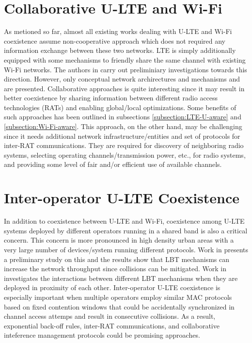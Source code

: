 \section{Collaborative U-LTE and Wi-Fi}
As metioned so far, almost all existing works dealing with U-LTE and Wi-Fi coexistence assume non-cooperative approach which does not required any information exchange between these two networks. LTE is simply additionally equipped with some mechanisms to friendly share the same channel with existing Wi-Fi networks. The authors in \cite{U-LTE-5G-2015, Coordinated-LTE-U-Wi-Fi-2015} carry out preliminiary investigations towards this direction. However, only conceptual network archirectures and mechanisms and are presented. Collaborative approaches is quite interesting since it may result in better coexistence by sharing information between different radio access technologies (RATs) and enabling global/local optimizations. Some benefits of such approaches has been outlined in subsections \ref{subsection:LTE-U-aware} and \ref{subsection:Wi-Fi-aware}. This approach, on the other hand, may be challenging since it needs additional network infrastructure/entities and set of protocols for inter-RAT communications. They are required for discovery of neighboring radio systems, selecting operating channels/transmission power, etc., for radio systems, and providing some level of fair and/or efficient use of available channels. 

\section{Inter-operator U-LTE Coexistence}
In addition to coexistence between U-LTE and Wi-Fi, coexistence among U-LTE systems deployed by different operators running in a shared band is also a critical concern. This concern is more pronounced in high density urban areas with a very large number of devices/system running different protocols. Work in \cite{LTE-U-ICC-WS-2015} presents a preliminary study on this and the results show that LBT mechanisms can increase the network throughput since collisions can be mitigated. Work in \cite{Enhanced-LTE-U-thesis-2015} investigates the interactions between different LBT mechanisms when they are deployed in proximity of each other. Inter-operator U-LTE coexistence is especially important when multiple operators employ similar MAC protocols based on fixed contention windows that could be accidentally synchronized in channel access attemps and result in consecutive collisions. As a result, exponential back-off rules, inter-RAT communications, and collaborative inteference management protocols could be promising approaches.

